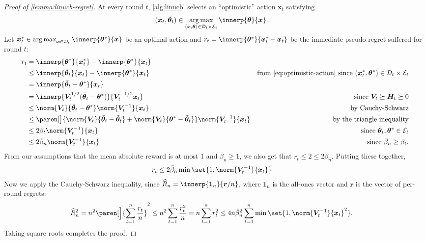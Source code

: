 \documentclass{article}
\renewcommand{\vec}[1]{\bm{#1}}
\newcommand{\inv}[1]{#1^{-1}}
\newcommand{\argmax}{\operatorname*{arg\,max}}
\DeclarePairedDelimiter{\paren}()
\newcommand{\D}{\mathcal{D}}
\newcommand{\E}{\mathcal{E}}
\begin{document}
\begin{proof}[Proof of \cref{lemma:linucb-regret}]
  At every round $t$, \cref{alg:linucb} selects an ``optimistic''
  action $\vec x_t$ satisfying
  \begin{align}\label{eq:optimistic-action}
    (\vec x_t,\bar{\vec\theta}_t)
    &\in \argmax_{(\vec x, \vec\theta) \in\D_t\times\E_t} \innerp{\vec\theta}{\vec x}.
  \end{align}
  Let $\vec x_t^* \in \argmax_{\vec x\in\D_t}\innerp{\vec\theta^*}{\vec x}$ be an optimal
  action and $r_t = \innerp{\vec\theta^*}{\vec x_t^* - \vec x_t}$ be the immediate
  pseudo-regret suffered for round $t$:
  \begin{align*}
    r_t &= \innerp{\vec\theta^*}{\vec x_t^*} - \innerp{\vec\theta^*}{\vec x_t} \\
        &\le \innerp{\bar{\vec\theta}_t}{\vec x_t} - \innerp{\vec\theta^*}{\vec x_t}
        &\text{from \eqref{eq:optimistic-action} since }
          (\vec x_t^*,\vec\theta^*) \in \D_t\times\E_t \\
        &= \innerp{\bar{\vec\theta}_t - \vec\theta^*}{\vec x_t} \\
       &= \innerp{\vec V_t^{1/2}(\bar{\vec\theta}_t - \vec\theta^*)}{\vec V_t^{-1/2} \vec x_t}
        &\text{since } \vec V_t \succeq \vec H_t \succeq 0 \\
        &\le \norm{\vec V_t}{\bar{\vec\theta}_t - \vec\theta^*}\norm{\inv{\vec V_t}}{\vec x_t}
        &\text{by Cauchy-Schwarz}\\
        &\le \paren[\big]{\norm{\vec V_t}{\bar{\vec\theta}_t - \tilde{\vec\theta}_t}
          + \norm{\vec V_t}{\vec\theta^* - \tilde{\vec\theta}_t}}
          \norm{\inv{\vec V_t}}{\vec x_t}
        &\text{by the triangle inequality}\\
        &\le 2\beta_t\norm{\inv{\vec V_t}}{\vec x_t}
        &\text{since } \bar{\vec\theta}_t, \vec\theta^* \in \E_t \\
        &\le 2\bar\beta_n\norm{\inv{\vec V_t}}{\vec x_t}
        &\text{since } \bar\beta_n \ge \beta_t.
  \end{align*}
  From our assumptions that the mean absolute reward is at most $1$
  and $\bar\beta_n \ge 1$, we also get that $r_t \le 2 \le 2\bar\beta_n$.
  Putting these together,
  \begin{align}\label{eq:regret-bound-oneround}
    r_t &\le 2\bar\beta_n \min\set{1, \norm{\inv{\vec V_t}}{\vec x_t}}
  \end{align}
  Now we apply the Cauchy-Schwarz inequality, since $\widehat{R}_n =
  \innerp{\vec 1_n}{\vec r/n}$, where $\vec 1_n$ is the all-ones vector
  and $\vec r$ is the vector of per-round regrets:
  \begin{align*}
    \widehat R_n^2 &= n^2 \paren[\Big]{\sum_{t=1}^n \frac{r_t}{n}}^2
                   \le n^2 \sum_{t=1}^n \frac{r_t^2}{n} = n\sum_{t=1}^nr_t^2
                   \le 4n\bar\beta_n^2\sum_{t=1}^n\min\set{1,\norm{\inv{\vec V_t}}{\vec x_t}^2}.
  \end{align*}
  Taking square roots completes the proof.
\end{proof}
\end{document}
